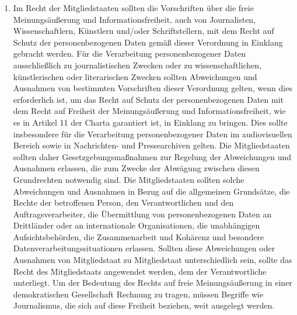 \begin{enumerate}
   \item Im Recht der Mitgliedstaaten sollten die Vorschriften über die freie Meinungsäußerung und Informationsfreiheit,
    auch von Journalisten, Wissenschaftlern, Künstlern und/oder Schriftstellern, mit dem Recht auf Schutz der
    personenbezogenen Daten gemäß dieser Verordnung in Einklang gebracht werden. Für die Verarbeitung personenbezogener
    Daten ausschließlich zu journalistischen Zwecken oder zu wissenschaftlichen, künstlerischen oder literarischen
    Zwecken sollten Abweichungen und Ausnahmen von bestimmten Vorschriften dieser Verordnung gelten, wenn dies
    erforderlich ist, um das Recht auf Schutz der personenbezogenen Daten mit dem Recht auf Freiheit der
    Meinungsäußerung und Informationsfreiheit, wie es in Artikel 11 der Charta garantiert ist, in Einklang zu bringen.
    Dies sollte insbesondere für die Verarbeitung personenbezogener Daten im audiovisuellen Bereich sowie in
    Nachrichten- und Pressearchiven gelten. Die Mitgliedstaaten sollten daher Gesetzgebungsmaßnahmen zur Regelung der
    Abweichungen und Ausnahmen erlassen, die zum Zwecke der Abwägung zwischen diesen Grundrechten notwendig sind. Die
    Mitgliedstaaten sollten solche Abweichungen und Ausnahmen in Bezug auf die allgemeinen Grundsätze, die Rechte der
    betroffenen Person, den Verantwortlichen und den Auftragsverarbeiter, die Übermittlung von personenbezogenen Daten
    an Drittländer oder an internationale Organisationen, die unabhängigen Aufsichtsbehörden, die Zusammenarbeit und
    Kohärenz und besondere Datenverarbeitungssituationen erlassen. Sollten diese Abweichungen oder Ausnahmen von
    Mitgliedstaat zu Mitgliedstaat unterschiedlich sein, sollte das Recht des Mitgliedstaats angewendet werden, dem der
    Verantwortliche unterliegt. Um der Bedeutung des Rechts auf freie Meinungsäußerung in einer demokratischen
    Gesellschaft Rechnung zu tragen, müssen Begriffe wie Journalismus, die sich auf diese Freiheit beziehen, weit
    ausgelegt werden.%
   \label{itm:eg-153}
   


\end{enumerate}
